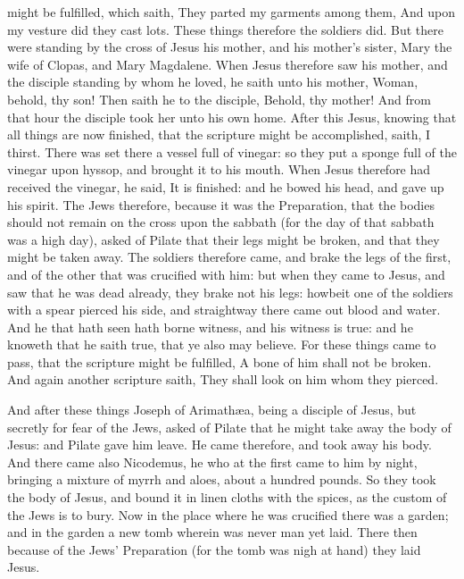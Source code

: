 might be fulfilled, which saith, They parted my garments among them, And upon my vesture did they cast lots.  These things therefore the soldiers did. But there were standing by the cross of Jesus his mother, and his mother’s sister, Mary the wife of Clopas, and Mary Magdalene. When Jesus therefore saw his mother, and the disciple standing by whom he loved, he saith unto his mother, Woman, behold, thy son! Then saith he to the disciple, Behold, thy mother! And from that hour the disciple took her unto his own home.  After this Jesus, knowing that all things are now finished, that the scripture might be accomplished, saith, I thirst. There was set there a vessel full of vinegar: so they put a sponge full of the vinegar upon hyssop, and brought it to his mouth. When Jesus therefore had received the vinegar, he said, It is finished: and he bowed his head, and gave up his spirit.  The Jews therefore, because it was the Preparation, that the bodies should not remain on the cross upon the sabbath (for the day of that sabbath was a high day), asked of Pilate that their legs might be broken, and that they might be taken away. The soldiers therefore came, and brake the legs of the first, and of the other that was crucified with him: but when they came to Jesus, and saw that he was dead already, they brake not his legs: howbeit one of the soldiers with a spear pierced his side, and straightway there came out blood and water. And he that hath seen hath borne witness, and his witness is true: and he knoweth that he saith true, that ye also may believe. For these things came to pass, that the scripture might be fulfilled, A bone of him shall not be broken. And again another scripture saith, They shall look on him whom they pierced.  

And after these things Joseph of Arimathæa, being a disciple of Jesus, but secretly for fear of the Jews, asked of Pilate that he might take away the body of Jesus: and Pilate gave him leave. He came therefore, and took away his body. And there came also Nicodemus, he who at the first came to him by night, bringing a mixture of myrrh and aloes, about a hundred pounds. So they took the body of Jesus, and bound it in linen cloths with the spices, as the custom of the Jews is to bury. Now in the place where he was crucified there was a garden; and in the garden a new tomb wherein was never man yet laid. There then because of the Jews’ Preparation (for the tomb was nigh at hand) they laid Jesus. 



